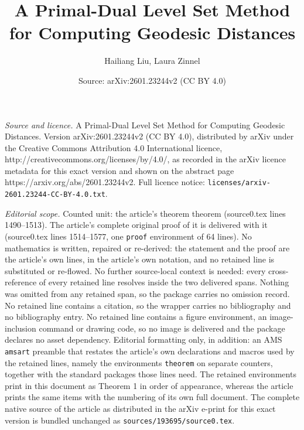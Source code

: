 \documentclass[10pt,a4paper]{amsart}
\title{A Primal-Dual Level Set Method for Computing Geodesic Distances}
\author{Hailiang Liu, Laura Zinnel}
\date{Source: arXiv:2601.23244v2 (CC BY 4.0)}
\begin{document}
\maketitle

\noindent\emph{Source and licence.} A Primal-Dual Level Set Method for Computing Geodesic Distances. Version arXiv:2601.23244v2 (CC BY 4.0), distributed by arXiv under the Creative Commons Attribution 4.0 International licence, http://creativecommons.org/licenses/by/4.0/, as recorded in the arXiv licence metadata for this exact version and shown on the abstract page https://arxiv.org/abs/2601.23244v2. Full licence notice: \texttt{licenses/arxiv-2601.23244-CC-BY-4.0.txt}.\par\smallskip

\noindent\textit{Editorial scope.} Counted unit: the article's theorem theorem (source0.tex lines 1490--1513). The article's complete original proof of it is delivered with it (source0.tex lines 1514--1577, one \texttt{proof} environment of 64 lines). No mathematics is written, repaired or re-derived: the statement and the proof are the article's own lines, in the article's own notation, and no retained line is substituted or re-flowed.  No further source-local context is needed: every cross-reference of every retained line resolves inside the two delivered spans.  Nothing was omitted from any retained span, so the package carries no omission record.  No retained line contains a citation, so the wrapper carries no bibliography and no bibliography entry.  No retained line contains a figure environment, an image-inclusion command or drawing code, so no image is delivered and the package declares no asset dependency.  Editorial formatting only, in addition: an AMS \texttt{amsart} preamble that restates the article's own declarations and macros used by the retained lines, namely the environments \texttt{theorem} on separate counters, together with the standard packages those lines need.  The retained environments print in this document as Theorem 1 in order of appearance, whereas the article prints the same items with the numbering of its own full document.  The complete native source of the article as distributed in the arXiv e-print for this exact version is bundled unchanged as \texttt{sources/193695/source0.tex}.
\end{document}
